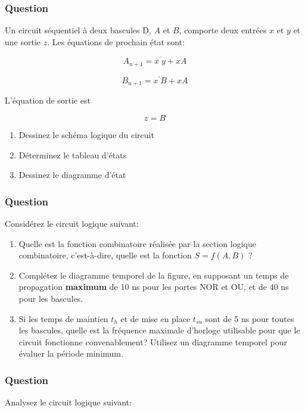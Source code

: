 \documentclass[11pt]{article}
\begin{document}
\subsubsection*{Question}
\label{sec:org7bee90e}
Un circuit séquentiel à deux bascules D, \(A\) et \(B\), comporte
  deux entrées \(x\) et \(y\) et une sortie \(z\). Les équations de
  prochain état sont:

$$A_{n+1} = x^\prime y + x A$$

$$B_{n+1} = x^\prime B + x A$$

L'équation de sortie est 

$$z=B$$

\begin{enumerate}
\item Dessinez le schéma logique du circuit

\item Déterminez le tableau d'états

\item Dessinez le diagramme d'état
\end{enumerate}

\subsubsection*{Question}
\label{sec:orge6f16c4}
 Considérez le circuit logique suivant:
\begin{center}

\end{center}

\begin{enumerate}
\item Quelle est la fonction combinatoire réalisée par la section
logique combinatoire, c'est-à-dire, quelle est la fonction \(S =
         f(A,B)\) ?

\item Complétez le diagramme temporel de la figure, en supposant un
temps de propagation \textbf{maximum} de 10 ns pour les portes NOR et OU,
et de 40 ns pour les bascules.

\item Si les temps de maintien \(t_{h}\) et de mise en place \(t_{su}\)
sont de 5 ns pour toutes les bascules, quelle est la fréquence
maximale d'horloge utilisable pour que le circuit fonctionne
convenablement? Utilisez un diagramme temporel pour évaluer la
période minimum.
\end{enumerate}

\subsubsection*{Question}
\label{sec:orgd4e01d2}
 Analysez le circuit logique suivant:
\begin{center}

\end{center}
\end{document}
